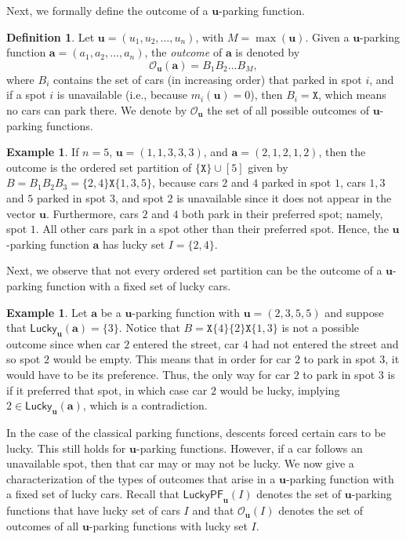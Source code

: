 \documentclass[reqno]{amsart}
\newcommand{\X}{\texttt{X}}
\newcommand{\LPF}{\mathsf{LuckyPF}}
\newcommand{\Lucky}{\mathsf{Lucky}}
\theoremstyle{definition}
\newtheorem{example}[theorem]{Example}
\newtheorem{definition}[theorem]{Definition}
\theoremstyle{remark}
\newcommand{\out}{\mathcal{O}}
\newcommand{\bsy}{\boldsymbol}
\begin{document}
Next, we formally define the outcome of a $\bsy{u}$-parking function. 


\begin{definition}\label{def:outcome of vector parking}
Let $\bsy{u}=(u_1,u_2,\ldots,u_n)$, with $M=\max(\bsy{u})$.
Given a $\bsy{u}$-parking function $\bsy{a}=(a_1,a_2,\ldots,a_n)$, the \emph{outcome} of $\bsy{a}$ is denoted by \[ \out_{\bsy{u}}(\bsy{a})=B_1B_2\ldots B_M,\] 
where $B_i$ contains the set of cars (in increasing order) that parked in spot $i$, and if a spot $i$ is unavailable (i.e., because $m_i(\bsy{u})=0$), then $B_i=\X$, which means no cars can park there.
We denote by $\out_{\bsy{u}}$ the set of all possible outcomes of $\bsy{u}$-parking functions.
\end{definition}




\begin{example}\label{ex:outcome def and lucky}
If $n=5$, $\bsy{u}=(1,1,3,3,3)$, and $\bsy{a}=(2,1,2,1,2)$, then the outcome is the ordered set partition of $\{\X\}\cup[5]$ given by $B=B_1B_2B_3=\{2,4\}\X\{1,3,5\}$,  because cars $2$ and $4$ parked in spot $1$, cars $1, 3$ and $5$ parked in spot $3$, and spot $2$ is unavailable since it does not appear in the vector $\bsy{u}$. 
Furthermore, cars $2$ and $4$ both park in their preferred spot; namely, spot $1$. 
All other cars park in a spot other than their preferred spot. 
Hence, the $\bsy{u}$-parking function $\bsy{a}$ has lucky set $I = \{2,4\}$.
\end{example}




Next, we observe that not every ordered set partition can be the outcome of a $\bsy{u}$-parking function with a fixed set of lucky cars. 

\begin{example}
Let $\bsy{a}$ be a $\bsy{u}$-parking function with $\bsy{u}=(2,3,5,5)$ and suppose that $\Lucky_{\bsy{u}}(\bsy{a})=\{3\}$. 
Notice that $B=\X\{4\}\{2\}\X\{1,3\}$ is not a possible outcome since when car $2$ entered the street, car $4$ had not entered the street and so spot $2$ would be empty. This means that in order for car $2$ to park in spot $3$, it would have to be its preference. Thus, the only way for car $2$ to park in spot $3$ is if it preferred that spot, in which case car $2$ would be lucky, implying $2\in \Lucky_{\bsy{u}}(\bsy{a})$, which is a contradiction. 
\end{example}

In the case of the classical parking functions, descents forced certain cars to be lucky. This still holds for $\bsy{u}$-parking functions. However, if a car follows an unavailable spot, then that car may or may not be lucky. We now give a characterization of the types of outcomes that arise in a $\bsy{u}$-parking function with a fixed set of lucky cars. Recall that $ \LPF_{\bsy{u}}(I)$ denotes the set of $\bsy{u}$-parking functions that have lucky set of cars $I$ and that $\out_{\bsy{u}}(I)$ denotes the set of outcomes of all $\bsy{u}$-parking functions with lucky set $I$.
\end{document}
